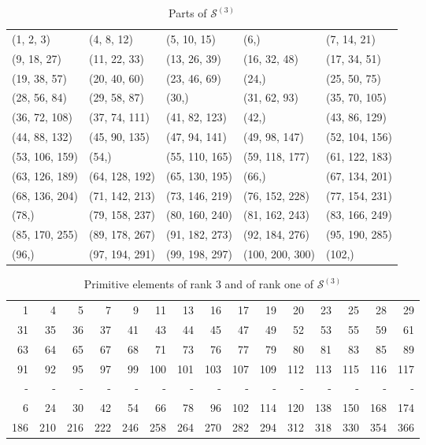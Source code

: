 \documentclass[12pt]{article}
\theoremstyle{definition}
\theoremstyle{remark}
\theoremstyle{plain}
\newcommand{\gpartition}[1]{\mathcal{S}^{(#1)}}
\begin{document}
\begin{table}[ptbh]
\caption{\label{tab:org063fdbe}Parts of \(\gpartition{3}\)}
\centering
\begin{tabular}{lllll}
(1, 2, 3) & (4, 8, 12) & (5, 10, 15) & (6,) & (7, 14, 21)\\
(9, 18, 27) & (11, 22, 33) & (13, 26, 39) & (16, 32, 48) & (17, 34, 51)\\
(19, 38, 57) & (20, 40, 60) & (23, 46, 69) & (24,) & (25, 50, 75)\\
(28, 56, 84) & (29, 58, 87) & (30,) & (31, 62, 93) & (35, 70, 105)\\
(36, 72, 108) & (37, 74, 111) & (41, 82, 123) & (42,) & (43, 86, 129)\\
(44, 88, 132) & (45, 90, 135) & (47, 94, 141) & (49, 98, 147) & (52, 104, 156)\\
(53, 106, 159) & (54,) & (55, 110, 165) & (59, 118, 177) & (61, 122, 183)\\
(63, 126, 189) & (64, 128, 192) & (65, 130, 195) & (66,) & (67, 134, 201)\\
(68, 136, 204) & (71, 142, 213) & (73, 146, 219) & (76, 152, 228) & (77, 154, 231)\\
(78,) & (79, 158, 237) & (80, 160, 240) & (81, 162, 243) & (83, 166, 249)\\
(85, 170, 255) & (89, 178, 267) & (91, 182, 273) & (92, 184, 276) & (95, 190, 285)\\
(96,) & (97, 194, 291) & (99, 198, 297) & (100, 200, 300) & (102,)\\
\end{tabular}
\end{table}

\begin{table}[ptbh]
\caption{\label{tab:org3771568}Primitive elements of rank 3 and of rank one of \(\gpartition{3}\)}
\centering
\begin{tabular}{rrrrrrrrrrrrrrr}
1 & 4 & 5 & 7 & 9 & 11 & 13 & 16 & 17 & 19 & 20 & 23 & 25 & 28 & 29\\
31 & 35 & 36 & 37 & 41 & 43 & 44 & 45 & 47 & 49 & 52 & 53 & 55 & 59 & 61\\
63 & 64 & 65 & 67 & 68 & 71 & 73 & 76 & 77 & 79 & 80 & 81 & 83 & 85 & 89\\
91 & 92 & 95 & 97 & 99 & 100 & 101 & 103 & 107 & 109 & 112 & 113 & 115 & 116 & 117\\
- & - & - & - & - & - & - & - & - & - & - & - & - & - & -\\
6 & 24 & 30 & 42 & 54 & 66 & 78 & 96 & 102 & 114 & 120 & 138 & 150 & 168 & 174\\
186 & 210 & 216 & 222 & 246 & 258 & 264 & 270 & 282 & 294 & 312 & 318 & 330 & 354 & 366\\
\end{tabular}
\end{table}
\end{document}
